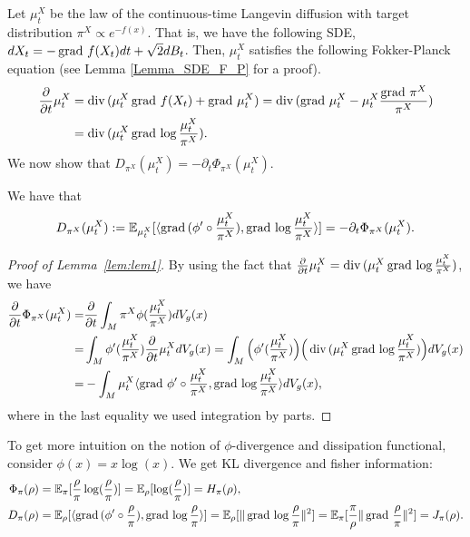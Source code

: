 Let $\mu_{t}^{X}$ be the law of the continuous-time 
Langevin diffusion with target distribution $\pi^{X} \propto e^{-f(x)}$.
That is, we have the following SDE, $dX_{t} = - \operatorname{grad\,} f(X_{t}) dt + \sqrt{2} dB_{t}$. Then, $\mu_{t}^{X}$ satisfies the following Fokker-Planck equation (see Lemma \ref{Lemma_SDE_F_P} for a proof).
\begin{align*}
        \frac{\partial}{\partial t} \mu_{t}^{X} 
        &= \operatorname{div\,} (\mu_{t}^{X}  \operatorname{grad\,} f(X_{t}) + \operatorname{grad\,} \mu_{t}^{X} ) 
        = \operatorname{div\,} ( \operatorname{grad\,} \mu_{t}^{X} - \mu_{t}^{X} \frac{ \operatorname{grad\,} \pi^{X} }{\pi^{X}} ) \\
        &= \operatorname{div\,} ( \mu_{t}^{X} \operatorname{grad\,} \log \frac{\mu_{t}^{X}}{\pi^{X}}).
\end{align*}
We now show that $D_{\pi^{X}}(\mu_{t}^{X}) = - \partial_{t} \Phi_{\pi^{X}}(\mu_{t}^{X})$.
\begin{lemma}\label{lem:lem1}
    We have that 
    \begin{align*}
        D_{\pi^{X}}(\mu_{t}^{X}) 
        := \mathbb{E}_{\mu_{t}^{X}} [ 
            \langle \operatorname{grad\,} (\phi' \circ \frac{\mu_{t}^{X}}{\pi^{X}}) , 
            \operatorname{grad\,} \log \frac{\mu_{t}^{X}}{\pi^{X}} \rangle]
        = - \partial_{t} \Phi_{\pi^{X}}(\mu_{t}^{X}).
    \end{align*}
\end{lemma}
\begin{proof}[Proof of Lemma~\ref{lem:lem1}]
    By using the fact that $\frac{\partial}{\partial t} \mu_{t}^{X} = \operatorname{div\,} ( \mu_{t}^{X} \operatorname{grad\,} \log \frac{\mu_{t}^{X}}{\pi^{X}})$,
    we have 
    \begin{align*}
            \frac{\partial}{\partial t} \Phi_{\pi^{X}}(\mu_{t}^{X})
        =& \frac{\partial}{\partial t} \int_{M} \pi^{X} \phi(\frac{\mu_{t}^{X}}{\pi^{X}}) dV_{g}(x) \\
        =& \int_{M} \phi'(\frac{\mu_{t}^{X}}{\pi^{X}}) \frac{\partial}{\partial t} \mu_{t}^{X} dV_{g}(x) 
        = \int_{M} \Big(\phi'(\frac{\mu_{t}^{X}}{\pi^{X}}) \Big) \Big(\operatorname{div\,} ( \mu_{t}^{X} \operatorname{grad\,} \log \frac{\mu_{t}^{X}}{\pi^{X}})\Big) dV_{g}(x) \\
        =& - \int_{M} \mu_{t}^{X}  \langle \operatorname{grad\,} \phi' \circ \frac{\mu_{t}^{X}}{\pi^{X}}, \operatorname{grad\,}  \log \frac{\mu_{t}^{X}}{\pi^{X}} \rangle dV_{g}(x),
    \end{align*}
    where in the last equality we used integration by parts.
\end{proof}

To get more intuition on the notion of $\phi$-divergence and dissipation functional, 
consider $\phi(x) = x \log(x)$. 
We get KL divergence and fisher information:
\begin{align*}
        \Phi_{\pi}(\rho) &= \mathbb{E}_{\pi}[\frac{\rho}{\pi} \log(\frac{\rho}{\pi})] = \mathbb{E}_{\rho} [\log(\frac{\rho}{\pi})] = H_{\pi}(\rho), \\
        D_{\pi}(\rho) &= \mathbb{E}_{\rho} [ 
            \langle \operatorname{grad\,} (\phi' \circ \frac{\rho}{\pi}) , 
            \operatorname{grad\,} \log \frac{\rho}{\pi} \rangle]
        = \mathbb{E}_{\rho} [ 
            \|\operatorname{grad\,} \log \frac{\rho}{\pi}\|^{2}]
        = \mathbb{E}_{\pi}[\frac{\pi}{\rho}\|\operatorname{grad\,} \frac{\rho}{\pi}\|^{2}]
        = J_{\pi}(\rho).
\end{align*}

